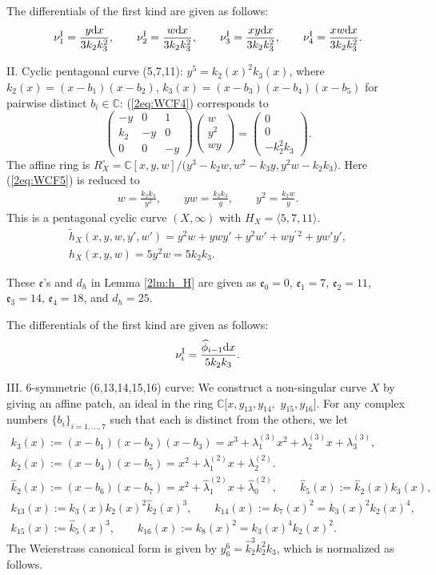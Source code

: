 \documentclass[10pt,a4paper]{amsart}
\def\CC{{\mathbb C}}
\def\fe{{\mathfrak e}}
\def\th{{\widetilde h}}
\def\hk{{\widehat k}}
\def\hlambda{{\widehat \lambda}}
\def\hphi{{\widehat \phi}}
\def\nuI#1{{\nu^{\mathrm{I}}_{#1}}}
\numberwithin{equation}{section}
\begin{document}
The differentials of the first kind are given as follows:
\[
\nuI{1}=\frac{y {\rm d} x}{3k_2k_3^2},\qquad
\nuI{2}=\frac{w {\rm d} x}{3k_2k_3^2},\qquad
\nuI{3}=\frac{xy {\rm d} x}{3k_2k_3^2},\qquad
\nuI{4}=\frac{xw {\rm d} x}{3k_2k_3^2}.
\]


II. Cyclic pentagonal curve (5,7,11):
$y^5 = k_2(x)^2 k_3(x)$, where
$k_2(x) = (x-b_1)(x-b_2)$,
$k_3(x) = (x-b_3)(x-b_4)(x-b_5)$ for pairwise distinct $b_i\in \CC$:
(\ref{2eq:WCF4}) corresponds to
\[
\begin{pmatrix}
-y & 0 & 1\\
k_2 & -y & 0\\
0 & 0 & - y
\end{pmatrix}
\begin{pmatrix}
w \\ y^2\\ wy
\end{pmatrix}
=\begin{pmatrix}
0 \\ 0\\ -k_2^2 k_3
\end{pmatrix}.
\]
The affine ring is
$R_X^\circ =\CC[x, y, w]/\big(y^3-k_2w, w^2-k_3y, y^2 w - k_2 k_3\big)$.
Here (\ref{2eq:WCF5}) is reduced to
\begin{gather*}
w = \frac{k_2 k_3}{y^2},\qquad
yw = \frac{k_2 k_3}{y},\qquad
y^2 = \frac{k_2 w}{y}.
\end{gather*}
This is a pentagonal cyclic curve $(X,\infty )$ with $H_X=\langle
5,7,11\rangle$.
\begin{gather*}
\th_X(x, y, w, y', w')=y^2 w + y w y' + y^2 w' + w y^{\prime\,2}+y w' y',\\
h_X(x,y, w) = 5 y^2 w =5k_2k_3.
\end{gather*}

These $\fe$'s and $d_h$ in Lemma \ref{2lm:h_H} are given as
$\fe_0 = 0$, $\fe_1 = 7$, $\fe_2 = 11$,
$\fe_3 = 14$, $\fe_4 = 18$, and $d_h = 25$.

The differentials of the first kind are given as follows:
\[
\nuI{i}=\frac{\hphi_{i-1} {\rm d} x}{5k_2k_3}.
\]

III. 6-symmetric (6,13,14,15,16) curve:
We construct a non-singular curve $X$ by giving an affine patch, an ideal in the ring $\CC[x, y_{13}, y_{14},$ $y_{15}, y_{16}]$.
For any complex numbers $\{b_i\}_{i=1, \dots, 7}$ such that each is distinct from the others, we let
\begin{gather*}
 k_3(x) := (x - b_1)(x - b_2)(x - b_3)
= x^3 + \lambda^{(3)}_{1} x^2 + \lambda^{(3)}_{2} x + \lambda^{(3)}_{3}, \\
 k_2(x) := (x - b_4) (x - b_5)
= x^2 + \lambda^{(2)}_{1} x + \lambda^{(2)}_{2} . \\
 \hk_{2}(x) := (x-b_6)(x-b_7)
 = x^2 + \hlambda^{(2)}_1 x + \hlambda^{(2)}_0, \qquad
 \hk_{5}(x) := \hk_{2}(x) k_{3}(x), \\
 k_{13}(x) := k_3(x)k_2(x)^2 \hk_2(x)^3, \qquad
 k_{14}(x) := k_7(x)^2 = k_3(x)^2k_2(x)^4 , \\
 k_{15}(x) := \hk_5(x)^3, \qquad k_{16}(x) := k_8(x)^2 = k_3(x)^4k_2(x)^2 .
\end{gather*}
The Weierstrass canonical form is given by $y_6^6=\hk_2^3k_2^2 k_3$, which is normalized as follows.
\end{document}
